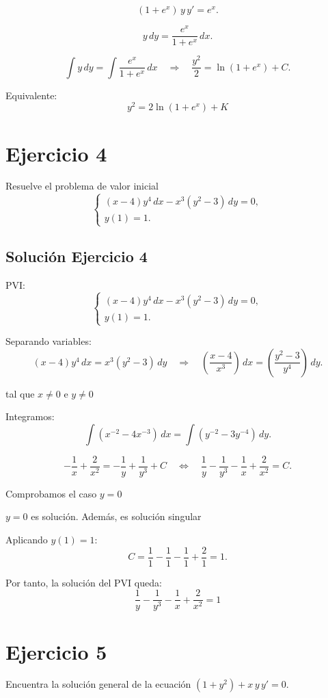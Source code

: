\documentclass[12pt]{article}
\begin{document}
\[
(1+e^x)\,y\,y'=e^x.
\]

\[
y\,dy=\frac{e^x}{1+e^x}\,dx.
\]

\[
\int y\,dy=\int\frac{e^x}{1+e^x}\,dx
\quad\Rightarrow\quad
\frac{y^2}{2}=\ln(1+e^x)+C.
\]

Equivalente:
\[
\boxed{\,y^2=2\ln(1+e^x)+K\,}
\]

\section*{Ejercicio 4}
Resuelve el problema de valor inicial
\[
\begin{cases}
(x - 4)y^4\,dx - x^3(y^2 - 3)\,dy = 0, \\
y(1) = 1.
\end{cases}
\]

\subsection*{Solución Ejercicio 4}

PVI:
\[
\begin{cases}
(x-4)y^4\,dx - x^3(y^2-3)\,dy=0,\\
y(1)=1.
\end{cases}
\]

Separando variables:
\[
(x-4)y^4\,dx=x^3(y^2-3)\,dy
\quad\Rightarrow\quad
\left(\frac{x-4}{x^3}\right)\,dx=\left(\frac{y^2-3}{y^4}\right)\,dy.
\]

tal que $x \neq 0$ e $y \neq 0$

Integramos:
\[
\int\left(x^{-2}-4x^{-3}\right)\,dx=\int\left(y^{-2}-3y^{-4}\right)\,dy.
\]

\[
-\frac{1}{x}+\frac{2}{x^2}=-\frac{1}{y}+\frac{1}{y^3}+C
\quad\Leftrightarrow\quad
\frac{1}{y}-\frac{1}{y^3}-\frac{1}{x}+\frac{2}{x^2}=C.
\]

Comprobamos el caso $y = 0$

\(y=0\) es solución. Además, es solución singular

Aplicando \(y(1)=1\):
\[
C=\frac{1}{1}-\frac{1}{1}-\frac{1}{1}+\frac{2}{1}= 1.
\]

Por tanto, la solución del PVI queda:
\[
\boxed{\;\frac{1}{y}-\frac{1}{y^3}-\frac{1}{x}+\frac{2}{x^2}=1\;}
\]

\section*{Ejercicio 5}
Encuentra la solución general de la ecuación $(1 + y^2) + x\,y\,y' = 0$.
\end{document}
